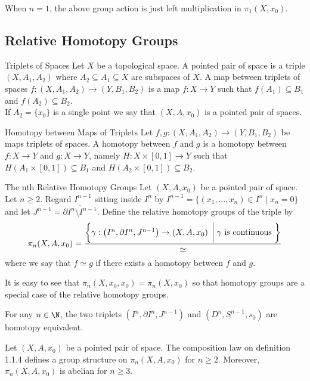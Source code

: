 \documentclass[a4paper]{article}
\begin{document}
When $n=1$, the above group action is just left multiplication in $\pi_1(X,x_0)$. 


\subsection{Relative Homotopy Groups}
\begin{defn}{Triplets of Spaces}{} Let $X$ be a topological space. A pointed pair of space is a triple $(X,A_1,A_2)$ where $A_2\subseteq A_1\subseteq X$ are subspaces of $X$. A map between triplets of spaces $f:(X,A_1,A_2)\to(Y,B_1,B_2)$ is a map $f:X\to Y$ such that $f(A_1)\subseteq B_1$ and $f(A_2)\subseteq B_2$. \\
If $A_2=\{x_0\}$ is a single point we say that $(X,A,x_0)$ is a pointed pair of spaces. 
\end{defn}

\begin{defn}{Homotopy between Maps of Triplets}{} Let $f,g:(X,A_1,A_2)\to(Y,B_1,B_2)$ be maps triplets of spaces. A homotopy between $f$ and $g$ is a homotopy between $f:X\to Y$ and $g:X\to Y$, namely $H:X\times[0,1]\to Y$ such that $H(A_1\times[0,1])\subseteq B_1$ and $H(A_2\times[0,1])\subseteq B_2$. 
\end{defn}

\begin{defn}{The nth Relative Homotopy Groups}{} Let $(X,A,x_0)$ be a pointed pair of space. Let $n\geq 2$. Regard $I^{n-1}$ sitting inside $I^n$ by $I^{n-1}=\{(x_1,\dots,x_n)\in I^n\;|\;x_n=0\}$ and let $J^{n-1}=\overline{\partial I^n\setminus I^{n-1}}$. Define the relative homotopy groups of the triple by $$\pi_n(X,A,x_0)=\frac{\left\{\gamma:\left(I^n,\partial I^n,J^{n-1}\right)\to\left(X,A,x_0\right)\;\bigg{|}\;\gamma\text{ is continuous }\right\}}{\simeq}$$ where we say that $f\simeq g$ if there exists a homotopy between $f$ and $g$. 
\end{defn}

It is easy to see that $\pi_n(X,x_0,x_0)=\pi_n(X,x_0)$ so that homotopy groups are a special case of the relative homotopy groups. 

\begin{lmm}{}{} For any $n\in\N$, the two triplets $(I^n,\partial I^n,J^{n-1})$ and $(D^n,S^{n-1},s_0)$ are homotopy equivalent. 
\end{lmm}

\begin{thm}{}{} Let $(X,A,x_0)$ be a pointed pair of space. The composition law on definition 1.1.4 defines a group structure on $\pi_n(X,A,x_0)$ for $n\geq 2$. Moreover, $\pi_n(X,A,x_0)$ is abelian for $n\geq 3$. 
\end{thm}
\end{document}
